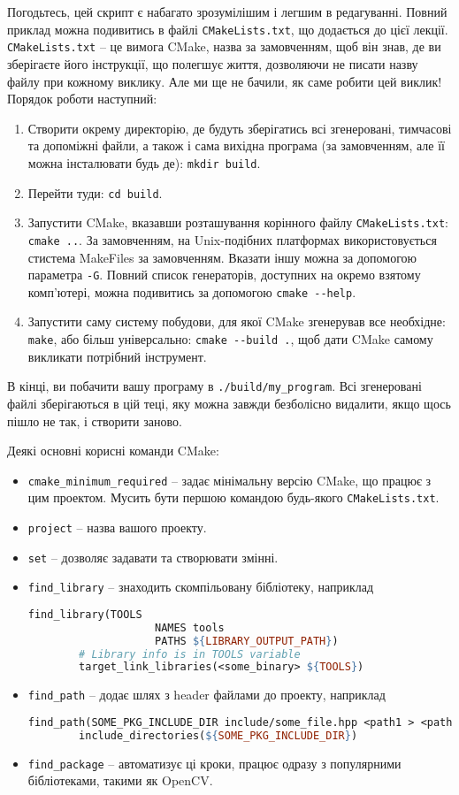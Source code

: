\documentclass[12pt]{article}
\begin{document}
	Погодьтесь, цей скрипт є набагато зрозумілішим і легшим в редагуванні. Повний приклад можна подивитись в файлі \texttt{CMakeLists.txt}, що додається до цієї лекції. \texttt{CMakeLists.txt} -- це вимога CMake, назва за замовченням, щоб він знав, де ви зберігаєте його інструкції, що полегшує життя, дозволяючи не писати назву файлу при кожному виклику. Але ми ще не бачили, як саме робити цей виклик! Порядок роботи наступний:
	\begin{enumerate}
		\item Створити окрему директорію, де будуть зберігатись всі згенеровані, тимчасові та допоміжні файли, а також і сама вихідна програма (за замовченням, але її можна інсталювати будь де): \texttt{mkdir build}.
		\item Перейти туди: \texttt{cd build}.
		\item Запустити CMake, вказавши розташування корінного файлу \texttt{CMakeLists.txt}: \texttt{cmake ..}. За замовченням, на Unix-подібних платформах використовується стистема MakeFiles за замовченням. Вказати іншу можна за допомогою параметра \texttt{-G}. Повний список генераторів, доступних на окремо взятому комп'ютері, можна подивитись за допомогою \texttt{cmake -{}-help}.
		\item Запустити саму систему побудови, для якої CMake згенерував все необхідне: \texttt{make}, або більш універсально: \texttt{cmake -{}-build .}, щоб дати CMake самому викликати потрібний інструмент.
	\end{enumerate}

	В кінці, ви побачити вашу програму в \texttt{./build/my\_program}. Всі згенеровані файлі зберігаються в цій теці, яку можна завжди безболісно видалити, якщо щось пішло не так, і створити заново.

	Деякі основні корисні команди CMake:
	\begin{itemize}
		\item \texttt{cmake\_minimum\_required} -- задає мінімальну версію CMake, що працює з цим проектом. Мусить бути першою командою будь-якого \texttt{CMakeLists.txt}.
		\item \texttt{project} -- назва вашого проекту.
		\item \texttt{set} -- дозволяє задавати та створювати змінні.
		\item \texttt{find\_library} -- знаходить скомпільовану бібліотеку, наприклад
		\begin{lstlisting}[language=make]
		find_library(TOOLS
					NAMES tools
					PATHS ${LIBRARY_OUTPUT_PATH}) 
		# Library info is in TOOLS variable
		target_link_libraries(<some_binary> ${TOOLS})
		\end{lstlisting}
		\item \texttt{find\_path} -- додає шлях з header файлами до проекту, наприклад
		\begin{lstlisting}[language=make]
		find_path(SOME_PKG_INCLUDE_DIR include/some_file.hpp <path1 > <path2 > ...)
		include_directories(${SOME_PKG_INCLUDE_DIR})
		\end{lstlisting}
		\item \texttt{find\_package} -- автоматизує ці кроки, працює одразу з популярними бібліотеками, такими як OpenCV.
	\end{itemize}
	
\end{document}
